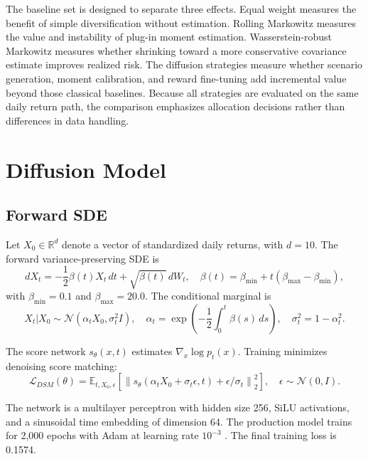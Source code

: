 \documentclass{article}
\newcommand{\R}{\mathbb{R}}
\newcommand{\E}{\mathbb{E}}
\newcommand{\calN}{\mathcal{N}}
\begin{document}
The baseline set is designed to separate three effects. Equal weight measures the
benefit of simple diversification without estimation. Rolling Markowitz measures
the value and instability of plug-in moment estimation. Wasserstein-robust
Markowitz measures whether shrinking toward a more conservative covariance
estimate improves realized risk. The diffusion strategies measure whether
scenario generation, moment calibration, and reward fine-tuning add incremental
value beyond those classical baselines. Because all strategies are evaluated on
the same daily return path, the comparison emphasizes allocation decisions rather
than differences in data handling.

\section{Diffusion Model}

\subsection{Forward SDE}

Let $X_0 \in \R^d$ denote a vector of standardized daily returns, with $d=10$.
The forward variance-preserving SDE is
\begin{equation}
  dX_t = -\frac{1}{2}\beta(t)X_t\,dt + \sqrt{\beta(t)}\,dW_t,
  \quad
  \beta(t)=\beta_{\min}+t(\beta_{\max}-\beta_{\min}),
\end{equation}
with $\beta_{\min}=0.1$ and $\beta_{\max}=20.0$. The conditional marginal is
\begin{equation}
  X_t|X_0 \sim \calN(\alpha_t X_0,\sigma_t^2 I),
  \quad
  \alpha_t=\exp\left(-\frac{1}{2}\int_0^t\beta(s)\,ds\right),
  \quad
  \sigma_t^2=1-\alpha_t^2.
\end{equation}

The score network $s_\theta(x,t)$ estimates
$\nabla_x \log p_t(x)$. Training minimizes denoising score matching:
\begin{equation}
  \mathcal{L}_{DSM}(\theta)
  =
  \E_{t,X_0,\epsilon}
  \left[
    \left\|
      s_\theta(\alpha_t X_0+\sigma_t\epsilon,t)
      + \epsilon/\sigma_t
    \right\|_2^2
  \right],
  \quad
  \epsilon \sim \calN(0,I).
\end{equation}

The network is a multilayer perceptron with hidden size 256, SiLU activations,
and a sinusoidal time embedding of dimension 64. The production model trains for
2,000 epochs with Adam at learning rate $10^{-3}$ \citep{kingma2015}. The final
training loss is 0.1574.
\end{document}
